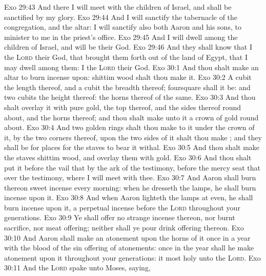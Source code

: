 \vs Exo 29:43 And there I will meet with the children of Israel, and  shall be sanctified by my glory.
\vs Exo 29:44 And I will sanctify the tabernacle of the congregation, and the altar: I will sanctify also both Aaron and his sons, to minister to me in the priest's office.
\vs Exo 29:45 And I will dwell among the children of Israel, and will be their God.
\vs Exo 29:46 And they shall know that I  the \textsc{Lord} their God, that brought them forth out of the land of Egypt, that I may dwell among them: I  the \textsc{Lord} their God.
\vs Exo 30:1 And thou shalt make an altar to burn incense upon:  shittim wood shalt thou make it.
\vs Exo 30:2 A cubit  the length thereof, and a cubit the breadth thereof; foursquare shall it be: and two cubits  the height thereof: the horns thereof  of the same.
\vs Exo 30:3 And thou shalt overlay it with pure gold, the top thereof, and the sides thereof round about, and the horns thereof; and thou shalt make unto it a crown of gold round about.
\vs Exo 30:4 And two golden rings shalt thou make to it under the crown of it, by the two corners thereof, upon the two sides of it shalt thou make ; and they shall be for places for the staves to bear it withal.
\vs Exo 30:5 And thou shalt make the staves  shittim wood, and overlay them with gold.
\vs Exo 30:6 And thou shalt put it before the vail that  by the ark of the testimony, before the mercy seat that  over the testimony, where I will meet with thee.
\vs Exo 30:7 And Aaron shall burn thereon sweet incense every morning: when he dresseth the lamps, he shall burn incense upon it.
\vs Exo 30:8 And when Aaron lighteth the lamps at even, he shall burn incense upon it, a perpetual incense before the \textsc{Lord} throughout your generations.
\vs Exo 30:9 Ye shall offer no strange incense thereon, nor burnt sacrifice, nor meat offering; neither shall ye pour drink offering thereon.
\vs Exo 30:10 And Aaron shall make an atonement upon the horns of it once in a year with the blood of the sin offering of atonements: once in the year shall he make atonement upon it throughout your generations: it  most holy unto the \textsc{Lord}.
\vs Exo 30:11 And the \textsc{Lord} spake unto Moses, saying,

